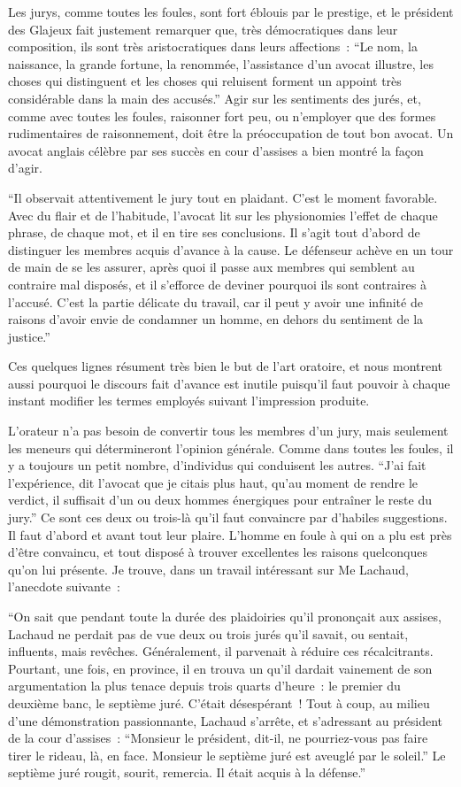 \documentclass[french,twoside]{book} %
\begin{document}
Les jurys, comme toutes les foules, sont fort éblouis par le prestige, et le président des Glajeux fait justement remarquer que, très démocratiques dans leur composition, ils sont très aristocratiques dans leurs affections : “Le nom, la naissance, la grande fortune, la renommée, l’assistance d’un avocat illustre, les choses qui distinguent et les choses qui reluisent forment un appoint très considérable dans la main des accusés.” Agir sur les sentiments des jurés, et, comme avec toutes les foules, raisonner fort peu, ou n’employer que des formes rudimentaires de raisonnement, doit être la préoccu­pation de tout bon avocat. Un avocat anglais célèbre par ses succès en cour d’assises a bien montré la façon d’agir.\par
“Il observait attentivement le jury tout en plaidant. C’est le moment favorable. Avec du flair et de l’habitude, l’avocat lit sur les physionomies l’effet de chaque phrase, de chaque mot, et il en tire ses conclusions. Il s’agit tout d’abord de distinguer les membres acquis d’avance à la cause. Le défenseur achève en un tour de main de se les assurer, après quoi il passe aux membres qui semblent au contraire mal disposés, et il s’efforce de deviner pourquoi ils sont contraires à l’accusé. C’est la partie délicate du travail, car il peut y avoir une infinité de raisons d’avoir envie de condamner un homme, en dehors du sentiment de la justice.”\par
Ces quelques lignes résument très bien le but de l’art oratoire, et nous montrent aussi pourquoi le discours fait d’avance est inutile puisqu’il faut pouvoir à chaque instant modifier les termes employés suivant l’impression produite.\par
L’orateur n’a pas besoin de convertir tous les membres d’un jury, mais seulement les meneurs qui détermineront l’opinion générale. Comme dans toutes les foules, il y a toujours un petit nombre, d’individus qui conduisent les autres. “J’ai fait l’expérience, dit l’avocat que je citais plus haut, qu’au moment de rendre le verdict, il suffisait d’un ou deux hommes énergiques pour entraîner le reste du jury.” Ce sont ces deux ou trois-là qu’il faut convaincre par d’habiles suggestions. Il faut d’abord et avant tout leur plaire. L’homme en foule à qui on a plu est près d’être convaincu, et tout disposé à trouver excellentes les raisons quelconques qu’on lui présente. Je trouve, dans un travail intéressant sur Me Lachaud, l’anecdote suivante :\par
“On sait que pendant toute la durée des plaidoiries qu’il prononçait aux assises, Lachaud ne perdait pas de vue deux ou trois jurés qu’il savait, ou sentait, influents, mais revêches. Généralement, il parvenait à réduire ces récalcitrants. Pourtant, une fois, en province, il en trouva un qu’il dardait vainement de son argumentation la plus tenace depuis trois quarts d’heure : le premier du deuxième banc, le septième juré. C’était désespérant ! Tout à coup, au milieu d’une démonstration passion­nante, Lachaud s’arrête, et s’adressant au président de la cour d’assises : “Monsieur le président, dit-il, ne pourriez-vous pas faire tirer le rideau, là, en face. Monsieur le septième juré est aveuglé par le soleil.” Le septième juré rougit, sourit, remercia. Il était acquis à la défense.”\par
\end{document}
